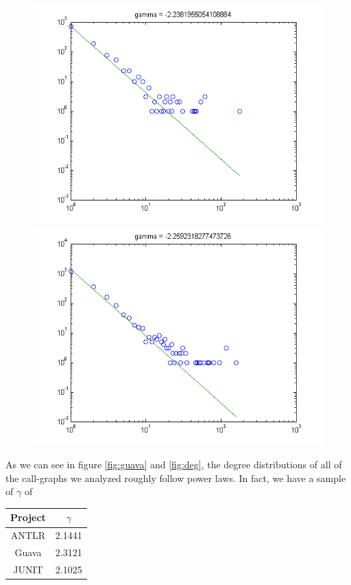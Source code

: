 \documentclass[11pt,a4paper,twocolumn]{article}
\begin{document}
\begin{singlespace}
\begin{figure}
\includegraphics[scale=0.5]{images/webmagic}
\includegraphics[scale=0.5]{images/xstream}
\end{figure}
As we can see in figure \ref{fig:guava} and \ref{fig:deg}, the degree distributions of
all of the call-graphs we analyzed roughly follow power laws. In fact, we have a sample of
$\gamma$ of
\begin{table}[H]
\centering
\begin{tabular}{|c|c|} \hline
Project & $\gamma$ \\ \hline
ANTLR \cite{ANTLR} & 2.1441 \\
Guava \cite{Guava} & 2.3121 \\
JUNIT \cite{JUnit} & 2.1025 \\

\end{tabular}
\end{table}
\end{singlespace}
\end{document}
